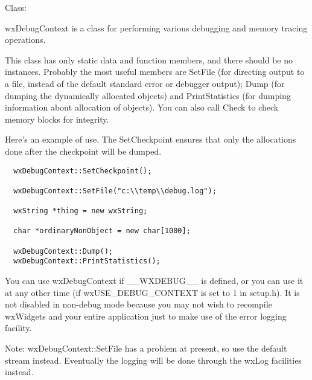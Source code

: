 Class: 

wxDebugContext is a class for performing various debugging and memory tracing
operations.

This class has only static data and function members, and there should be
no instances. Probably the most useful members are SetFile (for directing output
to a file, instead of the default standard error or debugger output);
Dump (for dumping the dynamically allocated objects) and PrintStatistics
(for dumping information about allocation of objects). You can also call
Check to check memory blocks for integrity.

Here's an example of use. The SetCheckpoint ensures that only the
allocations done after the checkpoint will be dumped.

\begin{verbatim}
  wxDebugContext::SetCheckpoint();

  wxDebugContext::SetFile("c:\\temp\\debug.log");

  wxString *thing = new wxString;

  char *ordinaryNonObject = new char[1000];

  wxDebugContext::Dump();
  wxDebugContext::PrintStatistics();
\end{verbatim}

You can use wxDebugContext if \_\_WXDEBUG\_\_ is defined, or you can use it
at any other time (if wxUSE\_DEBUG\_CONTEXT is set to 1 in setup.h). It is not disabled
in non-debug mode because you may not wish to recompile wxWidgets and your entire application
just to make use of the error logging facility.

Note: wxDebugContext::SetFile has a problem at present, so use the default stream instead.
Eventually the logging will be done through the wxLog facilities instead.

